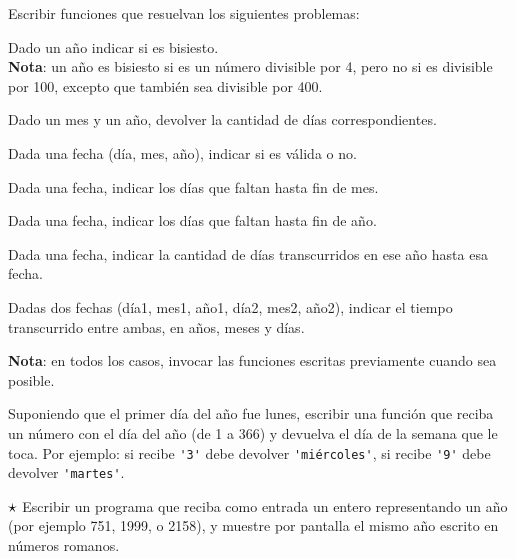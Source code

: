 \begin{ejercicio} Escribir funciones que resuelvan los siguientes problemas:
\begin{partes}
    \item Dado un año indicar si es bisiesto. \\
{\bf Nota}: un año es bisiesto si es un número divisible por 4, pero no si es
divisible por 100, excepto que también sea divisible por 400.

    \item Dado un mes y un año, devolver la cantidad de días correspondientes.

    \item Dada una fecha (día, mes, año), indicar si es válida o no.

    \item Dada una fecha, indicar los días que faltan hasta fin de mes.

    \item Dada una fecha, indicar los días que faltan hasta fin de año.

    \item Dada una fecha, indicar la cantidad de días transcurridos en ese año
hasta esa fecha.

    \item Dadas dos fechas (día1, mes1, año1, día2, mes2, año2), indicar el
tiempo transcurrido entre ambas, en años, meses y días.
\end{partes}
{\bf Nota}: en todos los casos, invocar las funciones escritas previamente
cuando sea posible.
\end{ejercicio}


\begin{ejercicio}
Suponiendo que el primer día del año fue lunes, escribir una función
que reciba un número con el día del año (de 1 a 366) y devuelva el día
de la semana que le toca. Por ejemplo: si recibe \verb|'3'| debe devolver
\verb|'miércoles'|, si recibe \verb|'9'| debe devolver \verb|'martes'|.
\end{ejercicio}


\begin{ejercicio}
$\dificil$ Escribir un programa que reciba como entrada un entero representando un año
(por ejemplo 751, 1999, o 2158), y muestre por pantalla el mismo año escrito en
números romanos.
\end{ejercicio}


